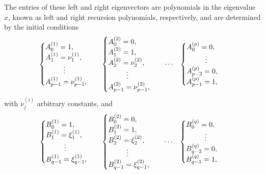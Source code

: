 \documentclass[11pt]{amsart}
\theoremstyle{plain}
\newcommand{\1}{\text{\fontseries{bx}\selectfont \textup 1}}
\begin{document}
The entries of these left and right eigenvectors are polynomials in the eigenvalue \(x\), known as left and right recursion polynomials, respectively, and are determined by the initial conditions
\begin{align}
	\label{eq:initcondtypeI}
	\begin{aligned}
		\begin{cases}
			A^{(1)}_0=1 , \\
			A^{(1)}_1= \nu^{(1)}_1 , \\
			\hspace{.895cm} \vdots \\
			A^{(1)}_{p-1}=\nu^{(1)}_{p-1} ,
		\end{cases}
		&&
		\begin{cases}
			A^{(2)}_0=0 , \\
			A^{(2)}_1= 1 , \\
			A^{(2)}_2= \nu^{(2)}_2 , \\
			\hspace{.895cm} \vdots \\
			A^{(2)}_{p-1}=\nu^{(2)}_{p-1} ,
		\end{cases}
		&& \cdots &&
		\begin{cases}
			A^{(p)}_0 =0 , \\
			\hspace{.915cm} \vdots \\
			A^{(p)}_{p-2} = 0 , \\
			A^{(p)}_{p-1} = 1,
		\end{cases}
	\end{aligned}
\end{align}
with \( \nu^{(i)}_{j} \) arbitrary constants, and 
\begin{align}
	\label{eq:initcondtypeII}
	\begin{aligned}
		\begin{cases}
			B^{(1)}_0=1 , \\
			B^{(1)}_1= \xi^{(1)}_1 , \\
			\hspace{.895cm} \vdots \\
			B^{(1)}_{q-1}=\xi^{(1)}_{q-1} ,
		\end{cases}
		&&
		\begin{cases}
			B^{(2)}_0=0 , \\
			B^{(2)}_1= 1 , \\
			B^{(2)}_2= \xi^{(2)}_2 , \\
			\hspace{.895cm} \vdots \\
			B^{(2)}_{q-1}=\xi^{(2)}_{q-1} ,
		\end{cases}
		&& \cdots &&
		\begin{cases}
			B^{(q)}_0 =0 , \\
			\hspace{.915cm} \vdots \\
			B^{(q)}_{q-2} = 0 , \\
			B^{(q)}_{q-1} = 1,
		\end{cases}
	\end{aligned}
\end{align}
\end{document}
